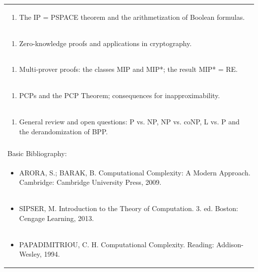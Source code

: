 \documentclass[11pt]{article}
\begin{document}
\begin{center}
\begin{longtable}{|p{4cm}|p{4cm}|p{4cm}|p{4cm}|}
\multicolumn{4}{|p{\dimexpr 16cm + 6\tabcolsep\relax}|}{\begin{enumerate}[start=25]\item The IP = PSPACE theorem and the arithmetization of Boolean formulas.\end{enumerate}}\\
\multicolumn{4}{|p{\dimexpr 16cm + 6\tabcolsep\relax}|}{\begin{enumerate}[start=26]\item Zero-knowledge proofs and applications in cryptography.\end{enumerate}}\\
\multicolumn{4}{|p{\dimexpr 16cm + 6\tabcolsep\relax}|}{\begin{enumerate}[start=27]\item Multi-prover proofs: the classes MIP and MIP*; the result MIP* = RE.\end{enumerate}}\\
\multicolumn{4}{|p{\dimexpr 16cm + 6\tabcolsep\relax}|}{\begin{enumerate}[start=28]\item PCPs and the PCP Theorem; consequences for inapproximability.\end{enumerate}}\\
\multicolumn{4}{|p{\dimexpr 16cm + 6\tabcolsep\relax}|}{\begin{enumerate}[start=29]\item General review and open questions: P vs. NP, NP vs. coNP, L vs. P and the derandomization of BPP.\end{enumerate}}\\
\multicolumn{4}{|p{\dimexpr 16cm + 6\tabcolsep\relax}|}{}\\
\hline
\multicolumn{4}{|p{16cm}|}{Basic Bibliography:}\\*
\multicolumn{4}{|p{\dimexpr 16cm + 6\tabcolsep\relax}|}{\begin{itemize}\item ARORA, S.; BARAK, B. Computational Complexity: A Modern Approach. Cambridge: Cambridge University Press, 2009.\end{itemize}}\\
\multicolumn{4}{|p{\dimexpr 16cm + 6\tabcolsep\relax}|}{\begin{itemize}\item SIPSER, M. Introduction to the Theory of Computation. 3. ed. Boston: Cengage Learning, 2013.\end{itemize}}\\
\multicolumn{4}{|p{\dimexpr 16cm + 6\tabcolsep\relax}|}{\begin{itemize}\item PAPADIMITRIOU, C. H. Computational Complexity. Reading: Addison-Wesley, 1994.\end{itemize}}\\

\end{longtable}
\end{center}
\end{document}
